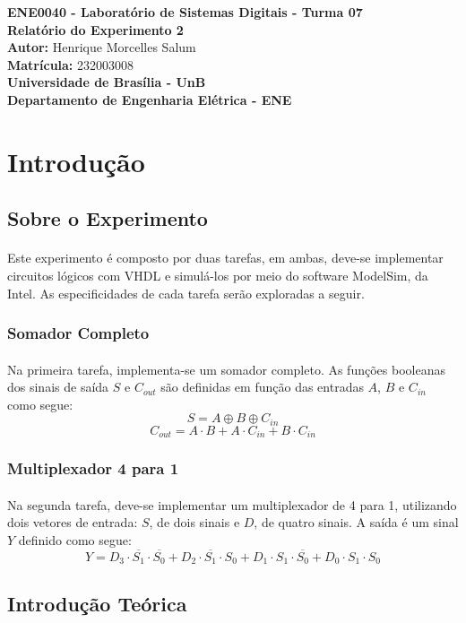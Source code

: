 \documentclass[a4paper,12pt]{article}
\newcommand{\capa}{
    \begin{titlepage}
        \begin{center}
            {\large \textbf{ENE0040 - Laboratório de Sistemas Digitais - Turma 07}} \\
            \vspace{3cm}
            {\Huge \textbf{Relatório do Experimento 2}} \\[1em]
            {\large \textbf{Autor:} Henrique Morcelles Salum} \\[0.5em]
            {\large \textbf{Matrícula:} 232003008} \\
            \vfill
            {\Large \textbf{Universidade de Brasília - UnB}} \\[0.75em]
            {\large \textbf{Departamento de Engenharia Elétrica - ENE}} \\
        \end{center}
    \end{titlepage}
}
\begin{document}
\capa

\newpage
\tableofcontents
\newpage

\section{Introdução}

\subsection{Sobre o Experimento}
\paragraph{}
Este experimento é composto por duas tarefas, em ambas, deve-se implementar circuitos lógicos com VHDL e simulá-los por meio do software ModelSim, da Intel. As especificidades de cada tarefa serão exploradas a seguir.

\subsubsection{Somador Completo}
\paragraph{}
Na primeira tarefa, implementa-se um somador completo. As funções booleanas dos sinais de saída $S$ e $C_{out}$ são definidas em função das entradas $A$, $B$ e $C_{in}$ como segue:
\[
S = A \oplus B \oplus C_{in}
\]
\[
C_{out} = A \cdot B + A \cdot C_{in} + B \cdot C_{in}
\]

\subsubsection{Multiplexador 4 para 1}
\paragraph{}
Na segunda tarefa, deve-se implementar um multiplexador de 4 para 1, utilizando dois vetores de entrada: $S$, de dois sinais e $D$, de quatro sinais. A saída é um sinal $Y$ definido como segue:
\[
Y = D_3 \cdot \overline{S_1} \cdot \overline{S_0} + D_2 \cdot \overline{S_1} \cdot S_0 + D_1 \cdot S_1 \cdot \overline{S_0} + D_0 \cdot S_1 \cdot S_0
\]

\subsection{Introdução Teórica}
\end{document}
